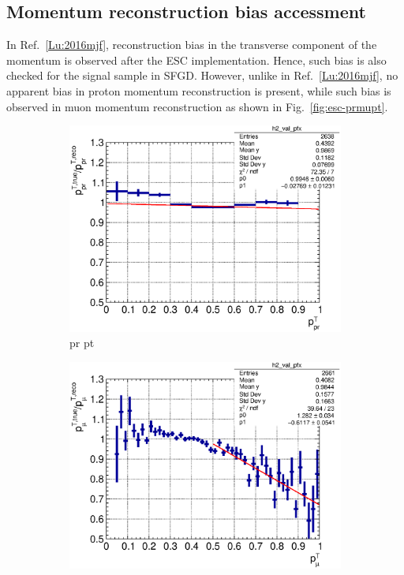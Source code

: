     \subsection{Momentum reconstruction bias accessment}
    \label{sec:sel-esc-bias}
    In Ref.~\ref{Lu:2016mjf}, reconstruction bias in the transverse component of the momentum is observed after the ESC implementation.
    Hence, such bias is also checked for the signal sample in SFGD.
    However, unlike in Ref.~\ref{Lu:2016mjf}, no apparent bias in proton momentum reconstruction is present, while such bias is observed in muon momentum reconstruction as shown in Fig.~\ref{fig:esc-prmupt}.
     \begin{figure}
        \centering
        \begin{subfigure}[b]{\dbfigwid\textwidth}
             \centering
             \includegraphics[width=\textwidth]{figures/sel/pr_pt_vs_pr_pt_bias_hist2d_al14.eps}
             \caption{pr pt}
             \label{subfig:esc-prpt}
        \end{subfigure}
        \begin{subfigure}[b]{\dbfigwid\textwidth}
             \centering
             \includegraphics[width=\textwidth]{figures/sel/mu_pt_vs_mu_pt_bias_hist2d_al14.eps}

\end{subfigure}
\end{figure}
